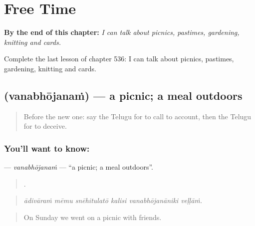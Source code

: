 
\chapter{Free Time}
\label{ch:te-free-time}

\begin{chapteropening}
\textbf{By the end of this chapter:} \emph{I can talk about picnics, pastimes, gardening, knitting and cards.}

Complete the last lesson of chapter 536: I can talk about picnics, pastimes, gardening, knitting and cards.
\end{chapteropening}

\section[\texorpdfstring{\te{వనభోజనం} (vanabhōjanaṁ)}{వనభోజనం (vanabhōjanaṁ)}]{ (vanabhōjanaṁ) — a picnic; a meal outdoors}

\label{lesson:TE-C536-vanabhojanam}



\begin{quote}
Before the new one: say the Telugu for to call to account, then the Telugu for to deceive.
\end{quote}

\subsection*{You'll want to know: }
\textbf{} — \emph{vanabhōjanaṁ} — \textquotedblleft{}a picnic; a meal outdoors\textquotedblright{}.

\begin{quote}
     .
\end{quote}

\begin{quote}
\emph{ādivāraṁ mēmu snēhitulatō kalisi vanabhōjanāniki veḷḷāṁ.}
\end{quote}

\begin{quote}
On Sunday we went on a picnic with friends.
\end{quote}

